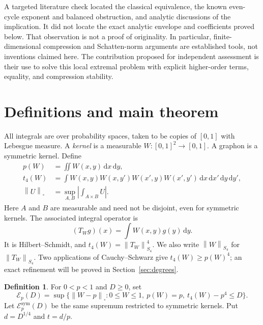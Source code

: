 \documentclass[11pt]{article}
\theoremstyle{definition}
\newtheorem{definition}[theorem]{Definition}
\newcommand{\1}{\mathbf 1}
\newcommand{\Cut}[1]{\left\|#1\right\|_{\square}}
\newcommand{\Sfour}[1]{\left\|#1\right\|_{S_4}}
\newcommand{\calE}{\mathcal E}
\newcommand{\dd}{\,\mathrm d}
\begin{document}
A targeted literature check located the classical equivalence, the known even-cycle exponent and balanced obstruction, and analytic discussions of the implication. It did not locate the exact analytic envelope and coefficients proved below. That observation is not a proof of originality. In particular, finite-dimensional compression and Schatten-norm arguments are established tools, not inventions claimed here. The contribution proposed for independent assessment is their use to solve this local extremal problem with explicit higher-order terms, equality, and compression stability.

\section{Definitions and main theorem}\label{sec:main}
All integrals are over probability spaces, taken to be copies of $[0,1]$ with Lebesgue measure. A \emph{kernel} is a measurable $W:[0,1]^2\to[0,1]$. A graphon is a symmetric kernel. Define
\begin{align}
 p(W)&=\iint W(x,y)\dd x\dd y,\\
 t_4(W)&=\int W(x,y)W(x,y')W(x',y)W(x',y')
                  \dd x\dd x'\dd y\dd y',\label{eq:t4}\\
 \Cut{U}&=\sup_{A,B}\left|\int_{A\times B}U\right|.\label{eq:cut}
\end{align}
Here $A$ and $B$ are measurable and need not be disjoint, even for symmetric kernels. The associated integral operator is
\[
 (T_Wg)(x)=\int W(x,y)g(y)\dd y.
\]
It is Hilbert--Schmidt, and $t_4(W)=\Sfour{T_W}^4$. We also write $\Sfour{W}$ for $\Sfour{T_W}$. Two applications of Cauchy--Schwarz give $t_4(W)\ge p(W)^4$; an exact refinement will be proved in Section~\ref{sec:degrees}.

\begin{definition}
For $0<p<1$ and $D\ge0$, set
\[
\calE_p(D)=\sup\{\Cut{W-p}:0\le W\le1,\ p(W)=p,\ t_4(W)-p^4\le D\}.
\]
Let $\calE_p^{\mathrm{sym}}(D)$ be the same supremum restricted to symmetric kernels. Put $d=D^{1/4}$ and $t=d/p$.
\end{definition}
\end{document}
